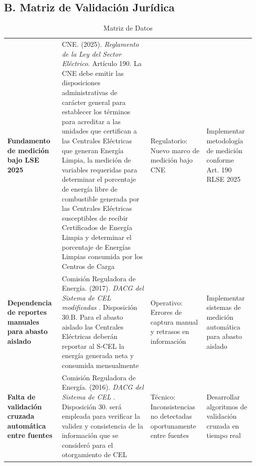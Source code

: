 \documentclass{cel}
\begin{document}
\vspace{0.4cm}
\subsection{B. Matriz de Validación Jurídica}
\nopagebreak

\vspace{0.3cm}
\begin{tabladoradoLargo}
\renewcommand{\tabularxcolumn}[1]{p{#1}}
\begin{xltabular}{\textwidth}{|X|X|X|X|}
\caption{Matriz de Datos} \\
\toprule
{}  &  &  &  \\
\midrule
\endhead
\textbf{Fundamento de medición bajo LSE 2025} & CNE. (2025). \textit{Reglamento de la Ley del Sector Eléctrico}. Artículo 190. \textquotedbl{}La CNE debe emitir las disposiciones administrativas de carácter general para establecer los términos para acreditar a las unidades que certifican a las Centrales Eléctricas que generan Energía Limpia, la medición de variables requeridas para determinar el porcentaje de energía libre de combustible generada por las Centrales Eléctricas susceptibles de recibir Certificados de Energía Limpia y determinar el porcentaje de Energías Limpias consumida por los Centros de Carga\textquotedbl{} & Regulatorio: Nuevo marco de medición bajo CNE & Implementar metodología de medición conforme Art. 190 RLSE 2025 \\ \hline
\textbf{Dependencia de reportes manuales para abasto aislado} & Comisión Reguladora de Energía. (2017). \textit{DACG del Sistema de CEL modificadas} . Disposición 30.B. \textquotedbl{}Para el abasto aislado las Centrales Eléctricas deberán reportar al S-CEL la energía generada neta y consumida mensualmente\textquotedbl{} & Operativo: Errores de captura manual y retrasos en información & Implementar sistemas de medición automática para abasto aislado \\ \hline
\textbf{Falta de validación cruzada automática entre fuentes} & Comisión Reguladora de Energía. (2016). \textit{DACG del Sistema de CEL} . Disposición 30. \textquotedbl{}será empleada para verificar la validez y consistencia de la información que se consideró para el otorgamiento de CEL\textquotedbl{} & Técnico: Inconsistencias no detectadas oportunamente entre fuentes & Desarrollar algoritmos de validación cruzada en tiempo real \\ \hline

\end{xltabular}
\end{tabladoradoLargo}
\end{document}
